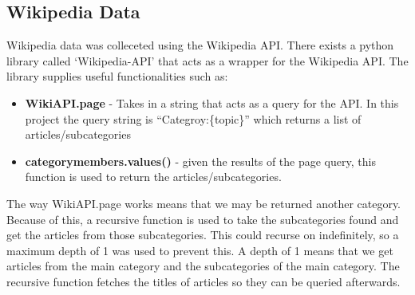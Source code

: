 \subsection{Wikipedia Data}
Wikipedia data was colleceted using the Wikipedia API. There exists a python library called `Wikipedia-API' \cite{wikiapi} that acts as a wrapper
for the Wikipedia API. The library supplies useful functionalities such as:
\begin{itemize}
    \item \textbf{WikiAPI.page} - Takes in a string that acts as a query for the API. In this project the query string is ``Categroy:\{topic\}'' which returns a list of articles/subcategories
    \item \textbf{categorymembers.values()} - given the results of the page query, this function is used to return the articles/subcategories.
\end{itemize}
The way WikiAPI.page works means that we may be returned another category. Because of this, a recursive function is used to take the subcategories found and get
the articles from those subcategories. This could recurse on indefinitely, so a maximum depth of 1 was used to prevent this. A depth of 1 means that we get articles
from the main category and the subcategories of the main category. The recursive function fetches the titles of articles so they can be queried afterwards.
\begin{algorithm}
    \caption{$get\_category\_members$}\label{alg:cat-members}
\begin{algorithmic}
    \STATE $\text{\textbf{INPUT}: category, level, max\_level}$
    \STATE $category\_members \gets \text{list of articles in category}$
    \bindent
    \STATE $- \textbf{WikiAPI.page(``Category:\{category\}'').}\textbf{categorymembers.values()}}$
    \eindent
    \STATE $titles \gets \text{empty list}$
    \FOR{$\text{each member in category\_members}$}
        \IF{$\text{member is a category AND level<max\_level}$}
            \STATE $titles.append(get\_category\_members(member, level+1, max\_level))$
        \ELSE
            \STATE $titles.append(\text{title of member})$
        \ENDIF
    \ENDFOR
    \RETURN titles
\end{algorithmic}
\end{algorithm}

